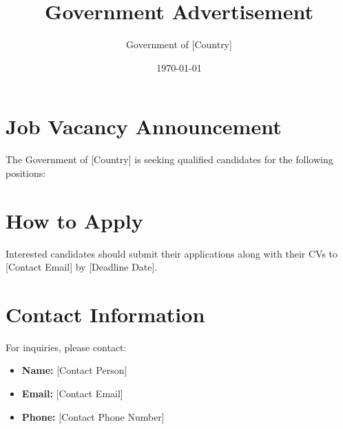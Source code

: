 \documentclass{article}
\begin{document}
\title{Government Advertisement}
\author{Government of [Country]}
\date{\today}
\maketitle

\section{Job Vacancy Announcement}
The Government of [Country] is seeking qualified candidates for the following positions:


\section{How to Apply}
Interested candidates should submit their applications along with their CVs to [Contact Email] by [Deadline Date].

\section{Contact Information}
For inquiries, please contact:
\begin{itemize}[label=\textbullet]
    \item \textbf{Name:} [Contact Person]
    \item \textbf{Email:} [Contact Email]
    \item \textbf{Phone:} [Contact Phone Number]
\end{itemize}
\end{document}
